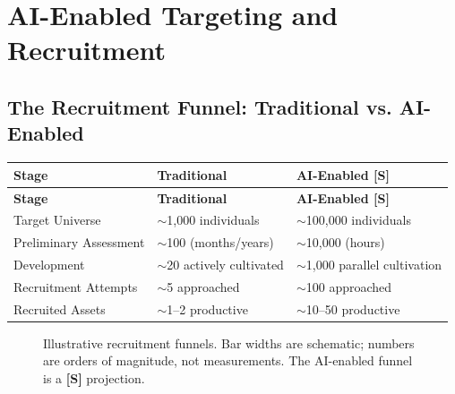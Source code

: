 \documentclass[11pt,letterpaper]{article}
\begin{document}
\section{AI-Enabled Targeting and Recruitment}\label{sec:targeting}

\subsection{The Recruitment Funnel: Traditional vs. AI-Enabled}

{\small
\begin{longtable}{L{4cm}L{4cm}L{4cm}}
\toprule
\textbf{Stage} & \textbf{Traditional} & \textbf{AI-Enabled [S]} \\
\midrule
\endfirsthead
\toprule
\textbf{Stage} & \textbf{Traditional} & \textbf{AI-Enabled [S]} \\
\midrule
\endhead
Target Universe & $\sim$1,000 individuals & $\sim$100,000 individuals \\*
Preliminary Assessment & $\sim$100 (months/years) & $\sim$10,000 (hours) \\
Development & $\sim$20 actively cultivated & $\sim$1,000 parallel cultivation \\
Recruitment Attempts & $\sim$5 approached & $\sim$100 approached \\*
Recruited Assets & $\sim$1--2 productive & $\sim$10--50 productive \\
\bottomrule
\end{longtable}}

\begin{figure}[htbp]
\centering
{}
\caption{Illustrative recruitment funnels. Bar widths are schematic; numbers are orders of magnitude, not measurements. The AI-enabled funnel is a \textbf{[S]} projection.}
\label{fig:funnel}
\end{figure}
\end{document}

